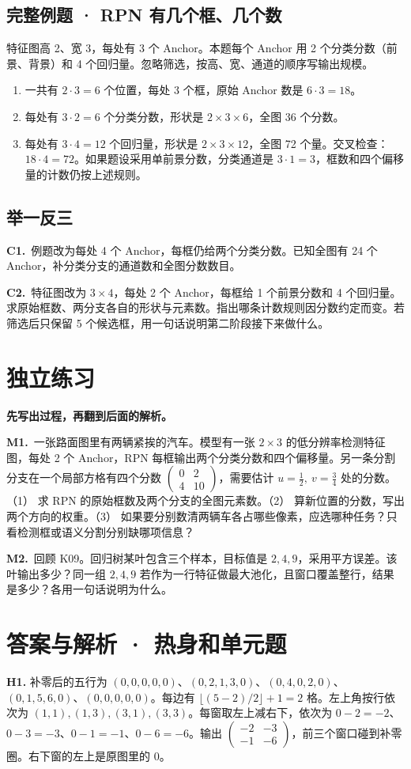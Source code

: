 \documentclass[UTF8,a4paper,11pt]{ctexart}
\newcommand{\CompactQuestion}[2]{\par\noindent\textbf{#1.}\ #2\par\vspace{.8em}}
\begin{document}
\subsection{完整例题 · RPN 有几个框、几个数}
特征图高 2、宽 3，每处有 3 个 Anchor。本题每个 Anchor 用 2 个分类分数（前景、背景）和 4 个回归量。忽略筛选，按高、宽、通道的顺序写输出规模。

\begin{enumerate}
\item 一共有 $2\cdot3=6$ 个位置，每处 3 个框，原始 Anchor 数是 $6\cdot3=18$。
\item 每处有 $3\cdot2=6$ 个分类分数，形状是 $2\times3\times6$，全图 36 个分数。
\item 每处有 $3\cdot4=12$ 个回归量，形状是 $2\times3\times12$，全图 72 个量。交叉检查：$18\cdot4=72$。如果题设采用单前景分数，分类通道是 $3\cdot1=3$，框数和四个偏移量的计数仍按上述规则。
\end{enumerate}
\subsection{举一反三}
\CompactQuestion{C1}{例题改为每处 4 个 Anchor，每框仍给两个分类分数。已知全图有 24 个 Anchor，补分类分支的通道数和全图分数数目。}
\CompactQuestion{C2}{特征图改为 $3\times4$，每处 2 个 Anchor，每框给 1 个前景分数和 4 个回归量。求原始框数、两分支各自的形状与元素数。指出哪条计数规则因分数约定而变。若筛选后只保留 5 个候选框，用一句话说明第二阶段接下来做什么。}
\clearpage
\section{独立练习}
\textbf{先写出过程，再翻到后面的解析。}

\CompactQuestion{M1}{一张路面图里有两辆紧挨的汽车。模型有一张 $2\times3$ 的低分辨率检测特征图，每处 2 个 Anchor，RPN 每框输出两个分类分数和四个偏移量。另一条分割分支在一个局部方格有四个分数 $\begin{pmatrix}0&2\\4&10\end{pmatrix}$，需要估计 $u=\frac12,\ v=\frac34$ 处的分数。（1） 求 RPN 的原始框数及两个分支的全图元素数。（2） 算新位置的分数，写出两个方向的权重。（3） 如果要分别数清两辆车各占哪些像素，应选哪种任务？只看检测框或语义分割分别缺哪项信息？}
\CompactQuestion{M2}{回顾 K09。回归树某叶包含三个样本，目标值是 $2,4,9$，采用平方误差。该叶输出多少？同一组 $2,4,9$ 若作为一行特征做最大池化，且窗口覆盖整行，结果是多少？各用一句话说明为什么。}
\clearpage
\section{答案与解析 · 热身和单元题}
\textbf{H1.} 补零后的五行为 $(0,0,0,0,0)$、$(0,2,1,3,0)$、$(0,4,0,2,0)$、$(0,1,5,6,0)$、$(0,0,0,0,0)$。每边有 $\lfloor(5-2)/2\rfloor+1=2$ 格。左上角按行依次为 $(1,1),(1,3),(3,1),(3,3)$。每窗取左上减右下，依次为 $0-2=-2$、$0-3=-3$、$0-1=-1$、$0-6=-6$。输出 $\begin{pmatrix}-2&-3\\-1&-6\end{pmatrix}$，前三个窗口碰到补零圈。右下窗的左上是原图里的 0。
\end{document}
